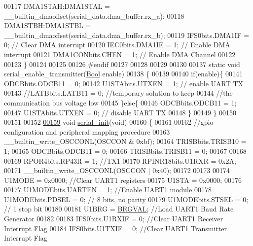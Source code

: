 \begin{DoxyCode}
00117 DMA1STAH:DMA1STAL = \_\_builtin\_dmaoffset(serial\_data.dma\_buffer.rx\_a);
00118 DMA1STBH:DMA1STBL = \_\_builtin\_dmaoffset(serial\_data.dma\_buffer.rx\_b);
00119 IFS0bits.DMA1IF = 0;                \textcolor{comment}{// Clear DMA interrupt}
00120 IEC0bits.DMA1IE = 1;                \textcolor{comment}{// Enable DMA interrupt}
00121 DMA1CONbits.CHEN = 1;               \textcolor{comment}{// Enable DMA Channel}
00122 
00123 \}
00124 
00125 
00126 \textcolor{preprocessor}{#endif}
00127 
00128 
00129 
00130 
00137 \textcolor{keyword}{static} \textcolor{keywordtype}{void} serial\_enable\_transmitter(\hyperlink{a00070_a253b248072cfc8bd812c69acd0046eed}{Bool} enable)
00138 \{
00139 
00140     \textcolor{keywordflow}{if}(enable)\{
00141     ODCBbits.ODCB11    = 0;
00142     U1STAbits.UTXEN    = 1;     \textcolor{comment}{// enable UART TX}
00143     \textcolor{comment}{//LATBbits.LATB11    = 0;   //temporary solution to keep}
00144                                 \textcolor{comment}{//the communication bus voltage low}
00145     \}\textcolor{keywordflow}{else}\{
00146     ODCBbits.ODCB11    = 1;
00147     U1STAbits.UTXEN    = 0;     \textcolor{comment}{// disable UART TX}
00148     \}
00149 \}
00150 
00151 
00152 
\hypertarget{a00028_source_l00159}{}\hyperlink{a00028_ad2b461e9e9044364a28a61cfadcacdd8}{00159} \textcolor{keywordtype}{void}     \hyperlink{a00028_ad2b461e9e9044364a28a61cfadcacdd8}{serial\_init}(\textcolor{keywordtype}{void})
00160 \{
00161 
00162     \textcolor{comment}{//gpio configuration and peripheral mapping procedure}
00163          \_\_builtin\_write\_OSCCONL(OSCCON & 0xbf);
00164              TRISBbits.TRISB10 = 1;
00165              ODCBbits.ODCB11   = 0;
00166              TRISBbits.TRISB11 = 0;
00167       
00168         
00169              RPOR4bits.RP43R   = 1; \textcolor{comment}{//TX1}
00170              RPINR18bits.U1RXR = 0x2A;
00171          \_\_builtin\_write\_OSCCONL(OSCCON | 0x40);
00172 
00173 
00174     U1MODE = 0x0000;            \textcolor{comment}{//Clear UART1 registers}
00175     U1STA  = 0x0000;
00176 
00177     U1MODEbits.UARTEN = 1;      \textcolor{comment}{//Enable UART1 module}
00178     U1MODEbits.PDSEL  = 0;      \textcolor{comment}{// 8 bits, no parity}
00179     U1MODEbits.STSEL  = 0;      \textcolor{comment}{// 1 stop bit}
00180 
00181     U1BRG = \hyperlink{a00028_aca346e181d2ffc089e22e75736a6ff63}{BRGVAL};             \textcolor{comment}{//Load UART1 Baud Rate Generator}
00182 
00183     IFS0bits.U1RXIF   = 0;      \textcolor{comment}{//Clear UART1 Receiver Interrupt Flag}
00184     IFS0bits.U1TXIF   = 0;      \textcolor{comment}{//Clear UART1 Transmitter Interrupt Flag}

\end{DoxyCode}
